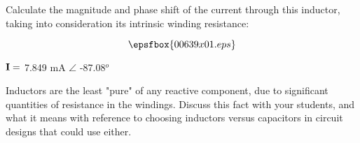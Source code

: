 

Calculate the magnitude and phase shift of the current through this inductor, taking into consideration its intrinsic winding resistance:

$$\epsfbox{00639x01.eps}$$







${\bf I} =$ 7.849 mA $\angle$ -87.08$^{o}$







Inductors are the least "pure" of any reactive component, due to significant quantities of resistance in the windings.  Discuss this fact with your students, and what it means with reference to choosing inductors versus capacitors in circuit designs that could use either.




